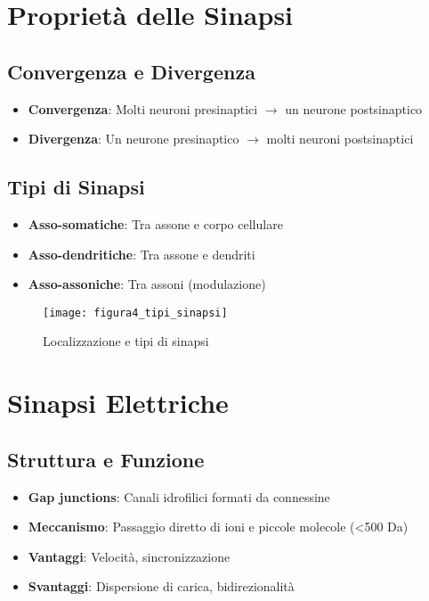 \documentclass{article}
\begin{document}
\section{Proprietà delle Sinapsi}
\subsection{Convergenza e Divergenza}
\begin{itemize}
\item \textbf{Convergenza}: Molti neuroni presinaptici $\rightarrow$ un neurone postsinaptico
\item \textbf{Divergenza}: Un neurone presinaptico $\rightarrow$ molti neuroni postsinaptici
\end{itemize}

\subsection{Tipi di Sinapsi}
\begin{itemize}
\item \textbf{Asso-somatiche}: Tra assone e corpo cellulare
\item \textbf{Asso-dendritiche}: Tra assone e dendriti
\item \textbf{Asso-assoniche}: Tra assoni (modulazione)
\end{itemize}

\begin{figure}[h]
\centering
\texttt{[image: figura4\_tipi\_sinapsi]}
\caption{Localizzazione e tipi di sinapsi}
\label{fig:tipi_sinapsi}
\end{figure}

\section{Sinapsi Elettriche}
\subsection{Struttura e Funzione}
\begin{itemize}
\item \textbf{Gap junctions}: Canali idrofilici formati da connessine
\item \textbf{Meccanismo}: Passaggio diretto di ioni e piccole molecole (<500 Da)
\item \textbf{Vantaggi}: Velocità, sincronizzazione
\item \textbf{Svantaggi}: Dispersione di carica, bidirezionalità
\end{itemize}
\end{document}
